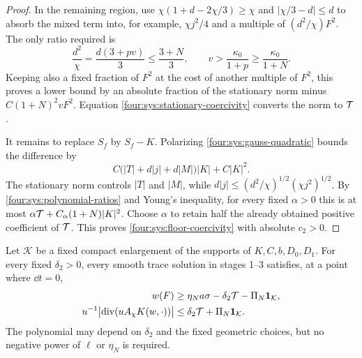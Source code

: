 \begin{proof}
In the remaining region, use
$\chi(1+d-2\chi/3)\ge\chi$ and $|\chi/3-d|\le d$ to absorb the
mixed term into, for example, $\chi j^2/4$ and a multiple of
$(d^2/\chi)F^2$.  The only ratio required is
\begin{equation}\label{four:sys:polynomial-ratios}
 \frac{d^2}{\chi}=\frac{d(3+pv)}3\le\frac{3+N}{3},\qquad
 v>\frac{\kappa_0}{1+p}\ge\frac{\kappa_0}{1+N}.
\end{equation}
Keeping also a fixed fraction of $F^2$ at the cost of another multiple
of $F^2$, this proves a lower bound by an absolute fraction of the
stationary norm minus $C(1+N)^2vF^2$.  Equation
\eqref{four:sys:stationary-coercivity} converts the norm to $\mathcal T$.

It remains to replace $S_f$ by $S_f-K$.  Polarizing
\eqref{four:sys:gauss-quadratic} bounds the difference by
\[
 C\bigl(|T|+d|j|+d|M|\bigr)|K|+C|K|^2.
\]
The stationary norm controls $|T|$ and $|M|$, while
$d|j|\le(d^2/\chi)^{1/2}(\chi j^2)^{1/2}$.
By \eqref{four:sys:polynomial-ratios} and Young's inequality, for every
fixed $\alpha>0$ this is at most
$\alpha\mathcal T+C_\alpha(1+N)|K|^2$.  Choose $\alpha$ to retain half
the already obtained positive coefficient of $\mathcal T$.  This proves
\eqref{four:sys:floor-coercivity} with absolute $c_2>0$.
\end{proof}

\begin{lemma}
\label{four:sys:stationary-errors}
Let $\mathcal K$ be a fixed compact enlargement of the supports of
$K,C,b,D_0,D_1$.  For every fixed $\delta_2>0$, every smooth trace
solution in stages 1--3 satisfies, at a point where $\dd t=0$,
\begin{equation}\label{four:sys:derivative-errors}
\begin{aligned}
 w(F)&\ge\eta_N a\sigma-\delta_2\mathcal T-\Pi_N\mathbf1_{\mathcal K},\\
 u^{-1}\bigl|\operatorname{div}(uA_\chi K(w,\cdot))\bigr|
   &\le\delta_2\mathcal T+\Pi_N\mathbf1_{\mathcal K}.
\end{aligned}
\end{equation}
The polynomial may depend on $\delta_2$ and the fixed geometric choices,
but no negative power of $\ell$ or $\eta_N$ is required.
\end{lemma}

